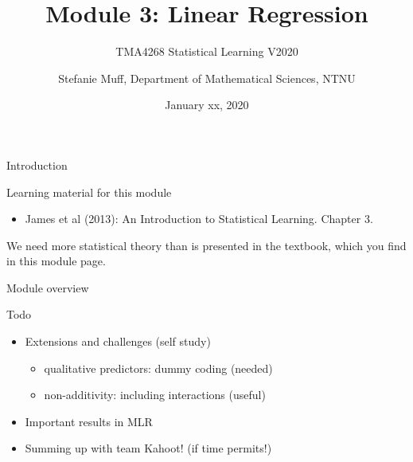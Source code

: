 \documentclass[10pt,ignorenonframetext,]{beamer}
\title{Module 3: Linear Regression}
\subtitle{TMA4268 Statistical Learning V2020}
\author{Stefanie Muff, Department of Mathematical Sciences, NTNU}
\date{January xx, 2020}
\providecommand{\tightlist}{%
  \setlength{\itemsep}{0pt}\setlength{\parskip}{0pt}}
\begin{document}
\frame{\titlepage}

\begin{frame}{Introduction}

\begin{block}{Learning material for this module}

\begin{itemize}
\tightlist
\item
  James et al (2013): An Introduction to Statistical Learning. Chapter
  3.
\end{itemize}

We need more statistical theory than is presented in the textbook, which
you find in this module page.

\end{block}

\end{frame}

\begin{frame}

\begin{block}{Module overview}

Todo

\end{block}

\end{frame}

\begin{frame}

\begin{itemize}
\tightlist
\item
  Extensions and challenges (self study)

  \begin{itemize}
  \tightlist
  \item
    qualitative predictors: dummy coding (needed)
  \item
    non-additivity: including interactions (useful)
  \end{itemize}
\item
  Important results in MLR
\item
  Summing up with team Kahoot! (if time permits!)
\end{itemize}

\end{frame}
\end{document}
